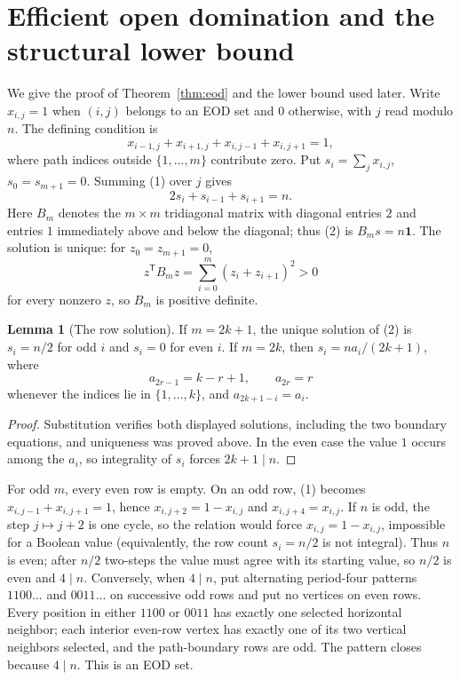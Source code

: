 \documentclass[11pt]{article}
\theoremstyle{definition}
\newtheorem{lemma}[theorem]{Lemma}
\begin{document}
\section{Efficient open domination and the structural lower bound}

We give the proof of Theorem~\ref{thm:eod} and the lower bound used later.
Write \(x_{i,j}=1\) when \((i,j)\) belongs to an EOD set and \(0\)
otherwise, with \(j\) read modulo \(n\). The defining condition is
\[
x_{i-1,j}+x_{i+1,j}+x_{i,j-1}+x_{i,j+1}=1,                 \tag{1}
\]
where path indices outside \(\{1,\ldots,m\}\) contribute zero. Put
\(s_i=\sum_jx_{i,j}\), \(s_0=s_{m+1}=0\). Summing (1) over \(j\) gives
\[
2s_i+s_{i-1}+s_{i+1}=n.                                  \tag{2}
\]
Here \(B_m\) denotes the \(m\times m\) tridiagonal matrix with diagonal
entries \(2\) and entries \(1\) immediately above and below the diagonal;
thus (2) is \(B_ms=n\mathbf 1\). The solution is unique: for
\(z_0=z_{m+1}=0\),
\[
 z^{\mathsf T}B_mz=\sum_{i=0}^{m}(z_i+z_{i+1})^2>0
\]
for every nonzero \(z\), so \(B_m\) is positive definite.

\begin{lemma}[The row solution]\label{lem:rowsolution}
If \(m=2k+1\), the unique solution of (2) is
\(s_i=n/2\) for odd \(i\) and \(s_i=0\) for even \(i\). If \(m=2k\),
then \(s_i=na_i/(2k+1)\), where
\[
a_{2r-1}=k-r+1,\qquad a_{2r}=r
\]
whenever the indices lie in \(\{1,\ldots,k\}\), and
\(a_{2k+1-i}=a_i\).
\end{lemma}

\begin{proof}
Substitution verifies both displayed solutions, including the two
boundary equations, and uniqueness was proved above. In the even case
the value \(1\) occurs among the \(a_i\), so integrality of \(s_i\)
forces \(2k+1\mid n\).
\end{proof}

For odd \(m\), every even row is empty. On an odd row, (1) becomes
\(x_{i,j-1}+x_{i,j+1}=1\), hence
\(x_{i,j+2}=1-x_{i,j}\) and \(x_{i,j+4}=x_{i,j}\). If \(n\) is odd, the
step \(j\mapsto j+2\) is one cycle, so the relation would force
\(x_{i,j}=1-x_{i,j}\), impossible for a Boolean value (equivalently,
the row count \(s_i=n/2\) is not integral). Thus \(n\) is even; after
\(n/2\) two-steps the value must agree with its starting value, so \(n/2\)
is even and \(4\mid n\). Conversely,
when \(4\mid n\), put alternating period-four patterns
\(1100\ldots\) and \(0011\ldots\) on successive odd rows and put no
vertices on even rows. Every position in either \(1100\) or \(0011\)
has exactly one selected horizontal neighbor; each interior even-row
vertex has exactly one of its two vertical neighbors selected, and the
path-boundary rows are odd. The pattern closes because \(4\mid n\).
This is an EOD set.
\end{document}
